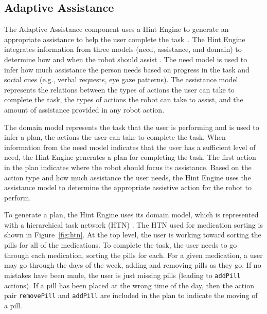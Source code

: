 \documentclass[letterpaper]{article}
\begin{document}
\subsection{Adaptive Assistance}

The Adaptive Assistance component uses a Hint Engine to generate an appropriate assistance to help the user complete the task~\cite{wilson2018general}.  The Hint Engine integrates information from three models (need, assistance, and domain) to determine how and when the robot should assist \cite{wilson2019developing}.  The need model is used to infer how much assistance the person needs based on progress in the task and social cues (e.g., verbal requests, eye gaze patterns).  The assistance model represents the relations between the types of actions the user can take to complete the task, the types of actions the robot can take to assist, and the amount of assistance provided in any robot action.

The domain model represents the task that the user is performing and is used to infer a plan, the actions the user can take to complete the task.  When information from the need model indicates that the user has a sufficient level of need, the Hint Engine generates a plan for completing the task.  The first action in the plan indicates where the robot should focus its assistance.  Based on the action type and how much assistance the user needs, the Hint Engine uses the assistance model to determine the appropriate assistive action for the robot to perform.

To generate a plan, the Hint Engine uses its domain model, which is represented with a hierarchical task network (HTN) \cite{nau1999shop}.  The HTN used for medication sorting is shown in Figure~\ref{fig:htn}.  At the top level, the user is working toward sorting the pills for all of the medications.  To complete the task, the user needs to go through each medication, sorting the pills for each. For a given medication, a user may go through the days of the week, adding and removing pills as they go.  If no mistakes have been made, the user is just missing pills (leading to \texttt{addPill} actions).  If a pill has been placed at the wrong time of the day, then the action pair \texttt{removePill} and \texttt{addPill} are included in the plan to indicate the moving of a pill.
\end{document}
